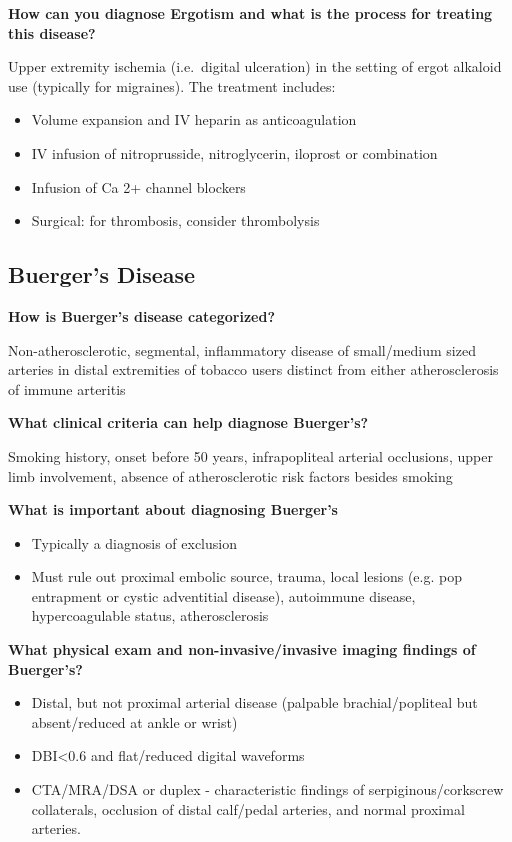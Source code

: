 \documentclass[
]{book}
\begin{document}
\textbf{How can you diagnose Ergotism and what is the process for treating
this disease?}

Upper extremity ischemia (i.e.~digital ulceration) in the setting of
ergot alkaloid use (typically for migraines). The treatment includes:

\begin{itemize}
\item
  Volume expansion and IV heparin as anticoagulation
\item
  IV infusion of nitroprusside, nitroglycerin, iloprost or combination
\item
  Infusion of Ca 2+ channel blockers
\item
  Surgical: for thrombosis, consider thrombolysis
\end{itemize}

\hypertarget{buergers-disease}{%
\subsection{Buerger's Disease}\label{buergers-disease}}

\textbf{How is Buerger's disease categorized?}

Non-atherosclerotic, segmental, inflammatory disease of small/medium
sized arteries in distal extremities of tobacco users distinct from
either atherosclerosis of immune
arteritis\citep{jacklcronenwettVascularDecisionMaking2020, lejoncour2018}

\textbf{What clinical criteria can help diagnose Buerger's?}

Smoking history, onset before 50 years, infrapopliteal arterial
occlusions, upper limb involvement, absence of atherosclerotic risk
factors besides smoking

\textbf{What is important about diagnosing Buerger's}

\begin{itemize}
\item
  Typically a diagnosis of exclusion
\item
  Must rule out proximal embolic source, trauma, local lesions (e.g.
  pop entrapment or cystic adventitial disease), autoimmune disease,
  hypercoagulable status, atherosclerosis
\end{itemize}

\textbf{What physical exam and non-invasive/invasive imaging findings of
Buerger's?}

\begin{itemize}
\item
  Distal, but not proximal arterial disease (palpable
  brachial/popliteal but absent/reduced at ankle or wrist)
\item
  DBI\textless0.6 and flat/reduced digital waveforms
\item
  CTA/MRA/DSA or duplex - characteristic findings of
  serpiginous/corkscrew collaterals, occlusion of distal calf/pedal
  arteries, and normal proximal arteries.\citep{busch2011, fujii2011}
\end{itemize}
\end{document}
